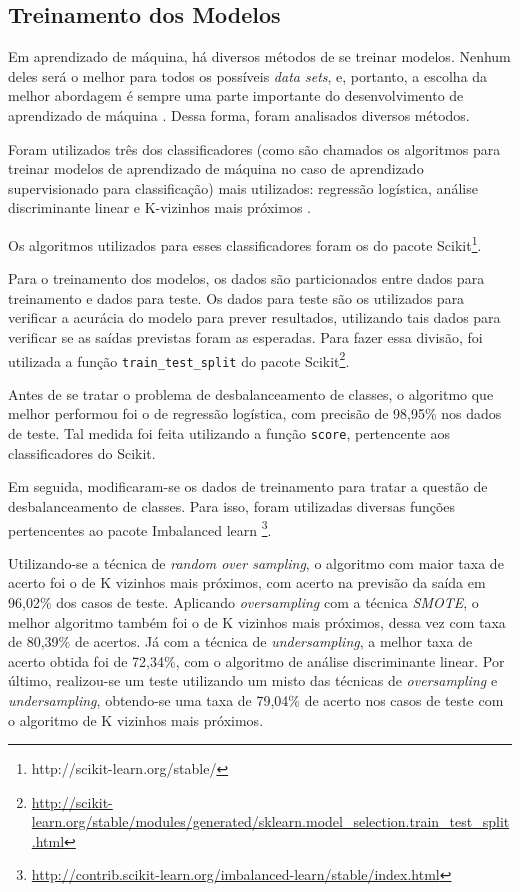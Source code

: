 		\subsection{Treinamento dos Modelos}

			Em aprendizado de máquina, há diversos métodos de se treinar modelos. Nenhum deles será o melhor para todos os possíveis \emph{data sets}, e, portanto, a escolha da melhor abordagem é sempre uma parte importante do desenvolvimento de aprendizado de máquina \cite{islr}. Dessa forma, foram analisados diversos métodos.

			Foram utilizados três dos classificadores (como são chamados os algoritmos para treinar modelos de aprendizado de máquina no caso de aprendizado supervisionado para classificação) mais utilizados: regressão logística, análise discriminante linear e K-vizinhos mais próximos \cite{islr}.

			Os algoritmos utilizados para esses classificadores foram os do pacote Scikit\footnote{http://scikit-learn.org/stable/}.

			Para o treinamento dos modelos, os dados são particionados entre dados para treinamento e dados para teste. Os dados para teste são os utilizados para verificar a acurácia do modelo para prever resultados, utilizando tais dados para verificar se as saídas previstas foram as esperadas. Para fazer essa divisão, foi utilizada a função \texttt{train\_test\_split} do pacote Scikit\footnote{\url{http://scikit-learn.org/stable/modules/generated/sklearn.model_selection.train_test_split.html}}.

			Antes de se tratar o problema de desbalanceamento de classes, o algoritmo que melhor performou foi o de regressão logística, com precisão de 98,95\% nos dados de teste. Tal medida foi feita utilizando a função \texttt{score}, pertencente aos classificadores do Scikit.

			Em seguida, modificaram-se os dados de treinamento para tratar a questão de desbalanceamento de classes. Para isso, foram utilizadas diversas funções pertencentes ao pacote Imbalanced learn \footnote{\url{http://contrib.scikit-learn.org/imbalanced-learn/stable/index.html}}.

			Utilizando-se a técnica de \emph{random over sampling}, o algoritmo com maior taxa de acerto foi o de K vizinhos mais próximos, com acerto na previsão da saída em 96,02\% dos casos de teste. Aplicando \emph{oversampling} com a técnica \emph{SMOTE}, o melhor algoritmo também foi o de K vizinhos mais próximos, dessa vez com taxa de 80,39\% de acertos. Já com a técnica de \emph{undersampling}, a melhor taxa de acerto obtida foi de 72,34\%, com o algoritmo de análise discriminante linear. Por último, realizou-se um teste utilizando um misto das técnicas de \emph{oversampling} e \emph{undersampling}, obtendo-se uma taxa de 79,04\% de acerto nos casos de teste com o algoritmo de K vizinhos mais próximos.

